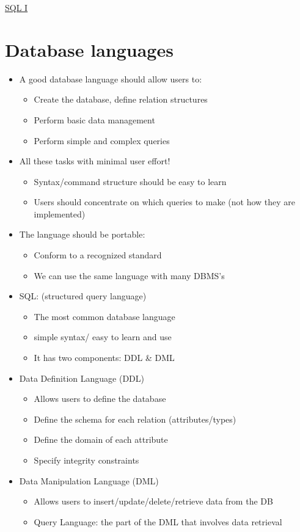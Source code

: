 \documentclass{article}[18pt]
\begin{document}
\begin{center}
\underline{\huge SQL I}
\end{center}
\section{Database languages}
\begin{itemize}
	\item A good database language should allow users to:
	\begin{itemize}
		\item Create the database, define relation structures
		\item Perform basic data management
		\item Perform simple and complex queries
	\end{itemize}
	\item All these tasks with minimal user effort!
	\begin{itemize}
		\item Syntax/command structure should be easy to learn
		\item Users should concentrate on which queries to make (not how they are implemented)
	\end{itemize}
	\item The language should be portable:
	\begin{itemize}
		\item Conform to a recognized standard
		\item We can use the same language with many DBMS's
	\end{itemize}
	\item SQL: (structured query language)
	\begin{itemize}
		\item The most common database language
		\item simple syntax/ easy to learn and use
		\item It has two components: DDL \& DML
	\end{itemize}
	\item Data Definition Language (DDL)
	\begin{itemize}
		\item Allows users to define the database
		\item Define the schema for each relation (attributes/types)
		\item Define the domain of each attribute
		\item Specify integrity constraints
	\end{itemize}
	\item Data Manipulation Language (DML)
	\begin{itemize}
		\item Allows users to insert/update/delete/retrieve data from the DB
		\item Query Language: the part of the DML that involves data retrieval
	\end{itemize}
\end{itemize}
\end{document}

